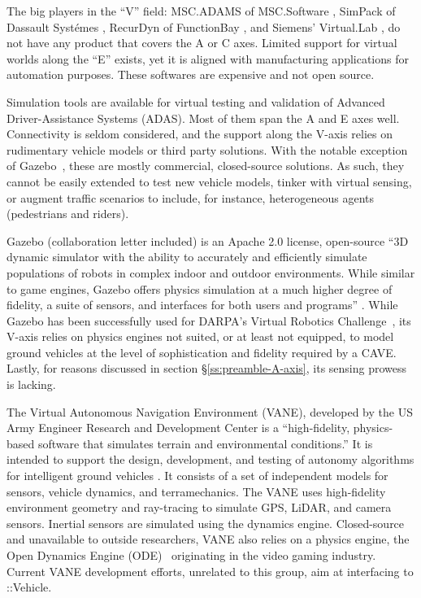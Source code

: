The big players in the ``V'' field: MSC.ADAMS of MSC.Software \cite{ADAMSsoftware,adamsManual}, SimPack of Dassault Syst\'emes \cite{SimpackSoftware}, RecurDyn of FunctionBay \cite{functionBay}, and Siemens' Virtual.Lab \cite{lmsVirtualLab}, do not have any product that covers the A or C axes. Limited support for virtual worlds along the ``E'' exists, yet it is aligned with manufacturing applications for automation purposes. These softwares are expensive and not open source.

Simulation tools are available for virtual testing and validation of Advanced Driver-Assistance Systems (ADAS).  Most of them span the A and E axes well. Connectivity is seldom considered, and the support along the V-axis relies on rudimentary vehicle models or third party solutions.  With the notable exception of Gazebo~\cite{gazebo}, these are mostly commercial, closed-source solutions. As such, they cannot be easily extended to test new vehicle models, tinker with virtual sensing, or augment traffic scenarios to include, for instance, heterogeneous agents (pedestrians and riders).

Gazebo \cite{gazebo,gazebo-VRC} (collaboration letter included) is an Apache 2.0 license, open-source ``3D dynamic simulator with the ability to accurately and efficiently simulate populations of robots in complex indoor and outdoor environments. While similar to game engines, Gazebo offers physics simulation at a much higher degree of fidelity, a suite of sensors, and interfaces for both users and programs'' \cite{gazebo, gazebo-VRC}. While Gazebo has been successfully used for DARPA's Virtual Robotics Challenge~\cite{gazebo-VRC}, its V-axis relies on physics engines not suited, or at least not equipped, to model ground vehicles at the level of sophistication and fidelity required by a CAVE. Lastly, for reasons discussed in section \S\ref{ss:preamble-A-axis}, its sensing prowess is lacking. 

The Virtual Autonomous Navigation Environment (VANE), developed by the US Army Engineer Research and Development Center is a ``high-fidelity, physics-based software that simulates terrain and environmental conditions.'' It is intended to support the design, development, and testing of autonomy algorithms for intelligent ground vehicles \cite{VANE-2012}. It consists of a set of independent models for sensors, vehicle dynamics, and terramechanics. The VANE uses high-fidelity environment geometry and ray-tracing to simulate GPS, LiDAR, and camera sensors. Inertial sensors are simulated using the dynamics engine. Closed-source and unavailable to outside researchers, VANE also relies on a physics engine, the Open Dynamics Engine (ODE)~\cite{ODE-website, Drumwright-2010} originating in the video gaming industry. Current VANE development efforts, unrelated to this group, aim at interfacing to {\CHRONO}::Vehicle.

